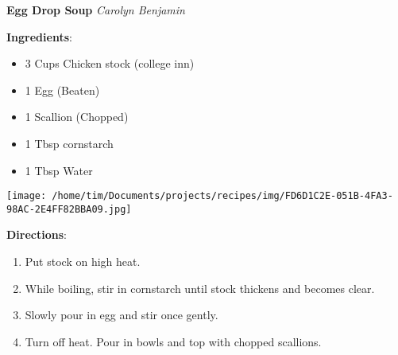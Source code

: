 \documentclass[11pt, twoside, openany]{book}
\begin{document}
\noindent\begin{minipage}[t]{\linewidth}%
{\Large\textbf{Egg Drop Soup}} \label{egg-drop-soup}\hfill\textit{Carolyn Benjamin}\\
\noindent\begin{minipage}[t]{0.78\linewidth}%
\textbf{Ingredients}:\vspace{-3mm}
\begin{multicols}{2}
\begin{itemize}\setlength\itemsep{-1mm}
\item 3 Cups Chicken stock (college inn)
\item 1 Egg (Beaten)
\item 1 Scallion (Chopped)
\item 1 Tbsp cornstarch
\item 1 Tbsp Water
\end{itemize}
\end{multicols}
\end{minipage}
\noindent\begin{minipage}[t]{0.18\linewidth}
\centering \strut\vspace*{-\baselineskip}\newline
\texttt{[image: /home/tim/Documents/projects/recipes/img/FD6D1C2E-051B-4FA3-98AC-2E4FF82BBA09.jpg]}\\
\end{minipage}\vspace{3mm}
\textbf{Directions}:
\vspace{-3mm}\begin{enumerate}\setlength\itemsep{-1mm}
\item Put stock on high heat.
\item While boiling, stir in cornstarch until stock thickens and becomes clear.
\item Slowly pour in egg and stir once gently.
\item Turn off heat. Pour in bowls and top with chopped scallions.
\end{enumerate}
\end{minipage}\vspace{8mm}
\end{document}
